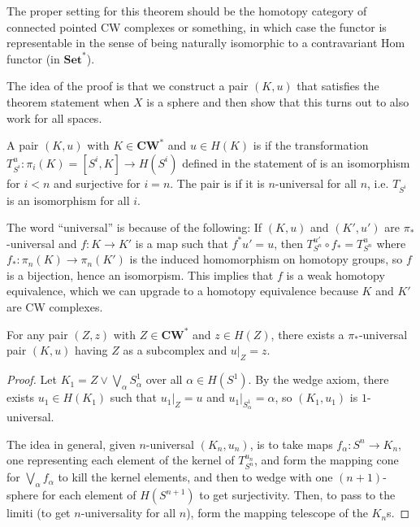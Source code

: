\documentclass[10pt]{article}
\begin{document}

\begin{remark}
    The proper setting for this theorem should be
    the homotopy category of connected pointed CW complexes or something,
    in which case the functor is representable
    in the sense of being naturally isomorphic
    to a contravariant Hom functor (in $\mathbf{Set}^*$).
\end{remark}

The idea of the proof is that we construct a pair $(K,u)$
that satisfies the theorem statement when $X$ is a sphere
and then show that this turns out to also work for all spaces.

\begin{definition}
    \label{def:n-pi-universal}
    A pair $(K,u)$ with $K\in\mathbf{CW}^*$ and $u\in H(K)$
    is  if the transformation
    $T^{u}_{S^i}\colon\pi_i(K)=[S^i,K]\to H(S^i)$
    defined in the statement of 
    is an isomorphism for $i < n$ and surjective for $i = n$.
    The pair is  if it is $n$-universal for all $n$,
    i.e. $T_{S^i}$ is an isomorphism for all $i$.
\end{definition}

\begin{remark}
    \label{rmk:universal-htpy-eq}
    The word ``universal'' is because of the following:
    If $(K,u)$ and $(K',u')$ are $\pi_*$-universal
    and $f\colon K\to K'$ is a map such that $f^*u' = u$,
    then $T^{u'}_{S^n} \circ f_* = T^u_{S^n}$
    where $f_*\colon \pi_n(K)\to \pi_n(K')$
    is the induced homomorphism on homotopy groups,
    so $f$ is a bijection, hence an isomorpism.
    This implies that $f$ is a weak homotopy equivalence,
    which we can upgrade to a homotopy equivalence
    because $K$ and $K'$ are CW complexes.
\end{remark}

\begin{lemma}
    \label{lem:pi-universal-construction}
    For any pair $(Z,z)$ with $Z\in\mathbf{CW}^*$ and $z\in H(Z)$,
    there exists a $\pi_*$-universal pair $(K,u)$
    having $Z$ as a subcomplex and $u|_Z = z$.
\end{lemma}

\begin{proof}
    Let $K_1 = Z\vee\bigvee_\alpha S^1_\alpha$ over all $\alpha\in H(S^1)$.
    By the wedge axiom, there exists $u_1\in H(K_1)$ such that
    $u_1|_Z = u$ and $u_1|_{S^1_\alpha} = \alpha$,
    so $(K_1,u_1)$ is $1$-universal.

    The idea in general, given $n$-universal $(K_n,u_n)$,
    is to take maps $f_\alpha\colon S^n\to K_n$,
    one representing each element of the kernel of $T^{u_n}_{S^n}$,
    and form the mapping cone for $\bigvee_\alpha f_\alpha$
    to kill the kernel elements, and then to
    wedge with one $(n+1)$-sphere for each element of
    $H(S^{n+1})$ to get surjectivity.
    Then, to pass to the limiti (to get $n$-universality for all $n$),
    form the mapping telescope of the $K_n$s.
\end{proof}
\end{document}
